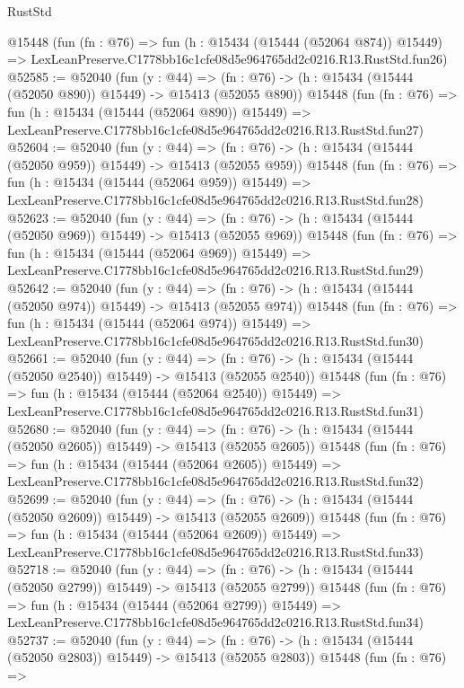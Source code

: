 \begin{lexlean}{RustStd}
\begin{coremodule}
    @15448
    (fun (fn : @76) =>
    fun (h : @15434 (@15444 (@52064 @874)) @15449) =>
    LexLeanPreserve.C1778bb16c1cfe08d5e964765dd2c0216.R13.RustStd.fun26)
@52585 := @52040
    (fun (y : @44) =>
    (fn : @76) -> (h : @15434 (@15444 (@52050 @890)) @15449) -> @15413 (@52055 @890))
    @15448
    (fun (fn : @76) =>
    fun (h : @15434 (@15444 (@52064 @890)) @15449) =>
    LexLeanPreserve.C1778bb16c1cfe08d5e964765dd2c0216.R13.RustStd.fun27)
@52604 := @52040
    (fun (y : @44) =>
    (fn : @76) -> (h : @15434 (@15444 (@52050 @959)) @15449) -> @15413 (@52055 @959))
    @15448
    (fun (fn : @76) =>
    fun (h : @15434 (@15444 (@52064 @959)) @15449) =>
    LexLeanPreserve.C1778bb16c1cfe08d5e964765dd2c0216.R13.RustStd.fun28)
@52623 := @52040
    (fun (y : @44) =>
    (fn : @76) -> (h : @15434 (@15444 (@52050 @969)) @15449) -> @15413 (@52055 @969))
    @15448
    (fun (fn : @76) =>
    fun (h : @15434 (@15444 (@52064 @969)) @15449) =>
    LexLeanPreserve.C1778bb16c1cfe08d5e964765dd2c0216.R13.RustStd.fun29)
@52642 := @52040
    (fun (y : @44) =>
    (fn : @76) -> (h : @15434 (@15444 (@52050 @974)) @15449) -> @15413 (@52055 @974))
    @15448
    (fun (fn : @76) =>
    fun (h : @15434 (@15444 (@52064 @974)) @15449) =>
    LexLeanPreserve.C1778bb16c1cfe08d5e964765dd2c0216.R13.RustStd.fun30)
@52661 := @52040
    (fun (y : @44) =>
    (fn : @76) -> (h : @15434 (@15444 (@52050 @2540)) @15449) -> @15413 (@52055 @2540))
    @15448
    (fun (fn : @76) =>
    fun (h : @15434 (@15444 (@52064 @2540)) @15449) =>
    LexLeanPreserve.C1778bb16c1cfe08d5e964765dd2c0216.R13.RustStd.fun31)
@52680 := @52040
    (fun (y : @44) =>
    (fn : @76) -> (h : @15434 (@15444 (@52050 @2605)) @15449) -> @15413 (@52055 @2605))
    @15448
    (fun (fn : @76) =>
    fun (h : @15434 (@15444 (@52064 @2605)) @15449) =>
    LexLeanPreserve.C1778bb16c1cfe08d5e964765dd2c0216.R13.RustStd.fun32)
@52699 := @52040
    (fun (y : @44) =>
    (fn : @76) -> (h : @15434 (@15444 (@52050 @2609)) @15449) -> @15413 (@52055 @2609))
    @15448
    (fun (fn : @76) =>
    fun (h : @15434 (@15444 (@52064 @2609)) @15449) =>
    LexLeanPreserve.C1778bb16c1cfe08d5e964765dd2c0216.R13.RustStd.fun33)
@52718 := @52040
    (fun (y : @44) =>
    (fn : @76) -> (h : @15434 (@15444 (@52050 @2799)) @15449) -> @15413 (@52055 @2799))
    @15448
    (fun (fn : @76) =>
    fun (h : @15434 (@15444 (@52064 @2799)) @15449) =>
    LexLeanPreserve.C1778bb16c1cfe08d5e964765dd2c0216.R13.RustStd.fun34)
@52737 := @52040
    (fun (y : @44) =>
    (fn : @76) -> (h : @15434 (@15444 (@52050 @2803)) @15449) -> @15413 (@52055 @2803))
    @15448
    (fun (fn : @76) =>

\end{coremodule}
\end{lexlean}
